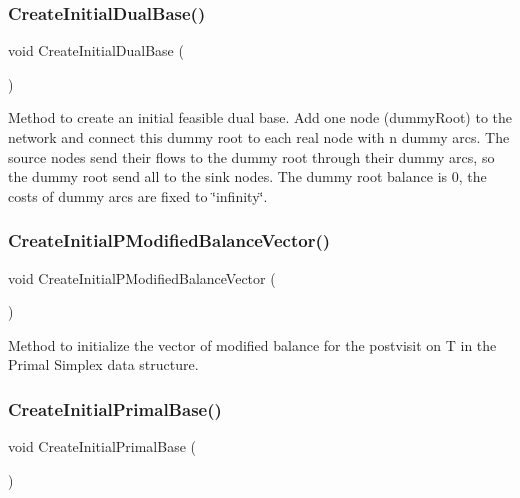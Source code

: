 \subsubsection{\texorpdfstring{Create\+Initial\+Dual\+Base()}{CreateInitialDualBase()}}
{\footnotesize\ttfamily void Create\+Initial\+Dual\+Base (\begin{DoxyParamCaption}\item[{void}]{ }\end{DoxyParamCaption})\hspace{0.3cm}{\ttfamily [private]}}

Method to create an initial feasible dual base. Add one node (dummy\+Root) to the network and connect this dummy root to each real node with n dummy arcs. The source nodes send their flows to the dummy root through their dummy arcs, so the dummy root send all to the sink nodes. The dummy root balance is 0, the costs of dummy arcs are fixed to \char`\"{}infinity\char`\"{}. \mbox{\label{class_m_c_f_simplex_a71015ef7f5966edd56837eaf9d1b55c5}} 
\subsubsection{\texorpdfstring{Create\+Initial\+P\+Modified\+Balance\+Vector()}{CreateInitialPModifiedBalanceVector()}}
{\footnotesize\ttfamily void Create\+Initial\+P\+Modified\+Balance\+Vector (\begin{DoxyParamCaption}\item[{void}]{ }\end{DoxyParamCaption})\hspace{0.3cm}{\ttfamily [private]}}

Method to initialize the vector of modified balance for the postvisit on T in the Primal Simplex data structure. \mbox{\label{class_m_c_f_simplex_a2842a4c775e477701fbb9302bb83917f}} 
\subsubsection{\texorpdfstring{Create\+Initial\+Primal\+Base()}{CreateInitialPrimalBase()}}
{\footnotesize\ttfamily void Create\+Initial\+Primal\+Base (\begin{DoxyParamCaption}\item[{void}]{ }\end{DoxyParamCaption})\hspace{0.3cm}{\ttfamily [private]}}

